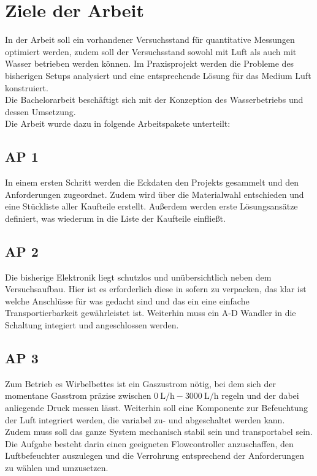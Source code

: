 \section{Ziele der Arbeit}

In der Arbeit soll ein vorhandener Versuchsstand für quantitative Messungen optimiert werden, zudem soll der Versuchsstand sowohl mit Luft als auch mit Wasser betrieben werden können. Im Praxisprojekt werden die Probleme des bisherigen Setups analysiert und eine entsprechende Lösung für das Medium Luft konstruiert. \\ 
Die Bachelorarbeit beschäftigt sich mit der Konzeption des Wasserbetriebs und dessen Umsetzung. \\
Die Arbeit wurde dazu in folgende Arbeitspakete unterteilt:


\subsection{AP 1}

In einem ersten Schritt werden die Eckdaten den Projekts gesammelt und den Anforderungen zugeordnet. Zudem wird über die Materialwahl entschieden und eine Stückliste aller Kaufteile erstellt. Außerdem werden erste Lösungsansätze definiert, was wiederum in die Liste der Kaufteile einfließt.


\subsection{AP 2}

Die bisherige Elektronik liegt schutzlos und unübersichtlich neben dem Versuchsaufbau. Hier ist es erforderlich diese in sofern zu verpacken, das klar ist welche Anschlüsse für was gedacht sind und das ein eine einfache Transportierbarkeit gewährleistet ist.
Weiterhin muss ein A-D Wandler in die Schaltung integiert und angeschlossen werden.

\subsection{AP 3}

Zum Betrieb es Wirbelbettes ist ein Gaszustrom nötig, bei dem sich der momentane Gasstrom präzise zwischen $\SI{0}{\liter / \hour} - \SI{3000}{\liter / \hour}$ regeln und der dabei anliegende Druck messen lässt. Weiterhin soll eine Komponente zur Befeuchtung der Luft integriert werden, die variabel zu- und abgeschaltet werden kann. \\
Zudem muss soll das ganze System mechanisch stabil sein und transportabel sein. \\
Die Aufgabe besteht darin einen geeigneten Flowcontroller anzuschaffen, den Luftbefeuchter auszulegen und die Verrohrung entsprechend der Anforderungen zu wählen und umzusetzen.

